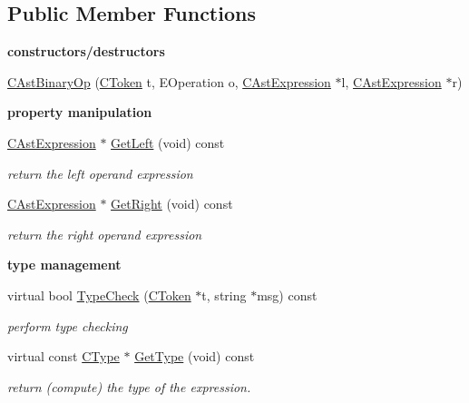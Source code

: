 \subsection*{Public Member Functions}
\begin{Indent}{\bf constructors/destructors}\par
\begin{DoxyCompactItemize}
\item 
\hyperlink{classCAstBinaryOp_a8f483c88e42f43cc75df53faf59b56a5}{C\-Ast\-Binary\-Op} (\hyperlink{classCToken}{C\-Token} t, E\-Operation o, \hyperlink{classCAstExpression}{C\-Ast\-Expression} $\ast$l, \hyperlink{classCAstExpression}{C\-Ast\-Expression} $\ast$r)
\end{DoxyCompactItemize}
\end{Indent}
\begin{Indent}{\bf property manipulation}\par
\begin{DoxyCompactItemize}
\item 
\hyperlink{classCAstExpression}{C\-Ast\-Expression} $\ast$ \hyperlink{classCAstBinaryOp_a39fa796bb4da80aab75065ccaf55408a}{Get\-Left} (void) const 
\begin{DoxyCompactList}\small\item\em return the left operand expression \end{DoxyCompactList}\item 
\hyperlink{classCAstExpression}{C\-Ast\-Expression} $\ast$ \hyperlink{classCAstBinaryOp_aa808bc2e7f27bc44e7bde9d12c549094}{Get\-Right} (void) const 
\begin{DoxyCompactList}\small\item\em return the right operand expression \end{DoxyCompactList}\end{DoxyCompactItemize}
\end{Indent}
\begin{Indent}{\bf type management}\par
\begin{DoxyCompactItemize}
\item 
virtual bool \hyperlink{classCAstBinaryOp_a74ae0aeae3a8c2aabec3c0527bb7d353}{Type\-Check} (\hyperlink{classCToken}{C\-Token} $\ast$t, string $\ast$msg) const 
\begin{DoxyCompactList}\small\item\em perform type checking \end{DoxyCompactList}\item 
\hypertarget{classCAstBinaryOp_a0bf80d7a8c4b2ea927ce1bd235785c4b}{virtual const \hyperlink{classCType}{C\-Type} $\ast$ \hyperlink{classCAstBinaryOp_a0bf80d7a8c4b2ea927ce1bd235785c4b}{Get\-Type} (void) const }\label{classCAstBinaryOp_a0bf80d7a8c4b2ea927ce1bd235785c4b}

\begin{DoxyCompactList}\small\item\em return (compute) the type of the expression. \end{DoxyCompactList}\end{DoxyCompactItemize}
\end{Indent}
